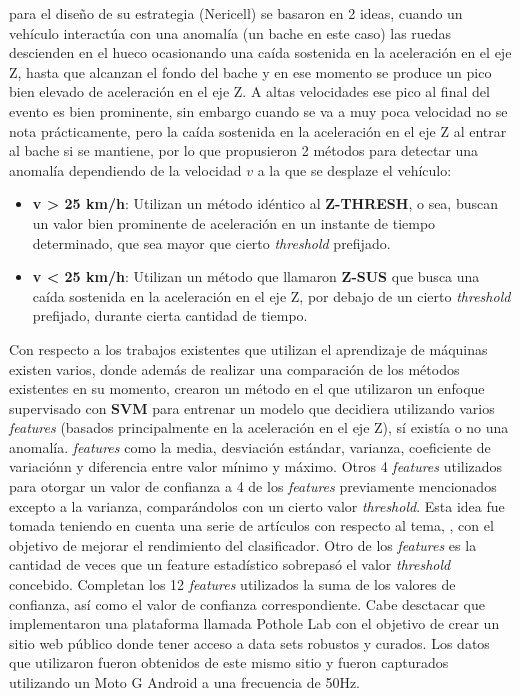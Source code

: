 \cite{mohan2008nericell} para el diseño de su estrategia (Nericell) se basaron en 2 ideas, cuando un vehículo interactúa con una
anomalía (un bache en este caso) las ruedas descienden en el hueco ocasionando una caída sostenida en la aceleración en el eje Z,
hasta que alcanzan el fondo del bache y en ese momento se produce un pico bien elevado de aceleración en el eje Z. A altas velocidades
ese pico al final del evento es bien prominente, sin embargo cuando se va a muy poca velocidad no se nota prácticamente, pero la caída
sostenida en la aceleración en el eje Z al entrar al bache si se mantiene, por lo que propusieron 2 métodos para detectar una anomalía
dependiendo de la velocidad $v$ a la que se desplaze el vehículo:\\

\begin{itemize}
	\item  \textbf {v > 25 km/h}:  Utilizan un método idéntico al \textbf {Z-THRESH}, o sea, buscan un valor bien prominente de
		aceleración en un instante de tiempo determinado, que sea mayor que cierto \emph{threshold} prefijado.\\
	\item \textbf {v < 25 km/h}:  Utilizan un método que llamaron \textbf {Z-SUS} que busca una caída sostenida en la aceleración
		en el eje Z, por debajo de un cierto \emph{threshold} prefijado, durante cierta cantidad de tiempo.\\
\end{itemize}

Con respecto a los trabajos existentes que utilizan el aprendizaje de máquinas existen varios, \cite{carlos2018evaluation} donde además de realizar 
una comparación de los métodos existentes en su momento, crearon un método en el que utilizaron un enfoque supervisado con \textbf{SVM} para entrenar 
un modelo que decidiera utilizando varios \emph{features} (basados principalmente en la aceleración en el eje Z), sí existía o no una anomalía. \emph{features}
como la media, desviación estándar, varianza, coeficiente de variaciónn y diferencia entre valor mínimo y máximo. Otros 4 \emph{features} utilizados para
otorgar un valor de confianza a 4 de los \emph{features} previamente mencionados excepto a la varianza, comparándolos con un cierto valor \emph{threshold}. Esta idea
fue tomada teniendo en cuenta una serie de artículos con respecto al tema, \cite{mednis2011real}, con el objetivo de mejorar el rendimiento
del clasificador. Otro de los \emph{features} es la cantidad de veces que un feature estadístico sobrepasó el valor \emph{threshold} concebido. Completan los 12 \emph{features}
utilizados la suma de los valores de confianza, así como el valor de confianza correspondiente. Cabe desctacar que implementaron una plataforma llamada 
Pothole Lab con el objetivo de crear un sitio web público donde tener acceso a data sets robustos y curados. Los datos que utilizaron fueron obtenidos de este
mismo sitio y fueron capturados utilizando un Moto G Android a una frecuencia de 50Hz.\\

